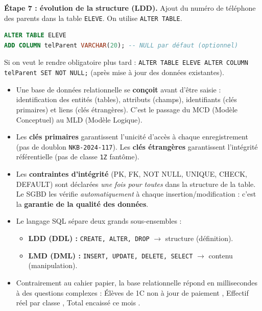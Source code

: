 \documentclass[11pt]{article}
\newcounter{popsec}
\newcounter{popsub}
\newcommand{\courssub}[1]{%
  \stepcounter{popsub}%
  \par\vspace{9pt}\noindent{\popxbold\fontsize{11.5}{13}\selectfont\color{popink}{\color{poporange}\thepopsec.\thepopsub}\hspace{6pt}#1}\par\nopagebreak\vspace{4pt}
}
\begin{document}
\begin{exoresolu}
\textbf{Étape 7 : évolution de la structure (LDD).}
Ajout du numéro de téléphone des parents dans la table \texttt{ELEVE}. On utilise \texttt{ALTER TABLE}.
\begin{lstlisting}[language=SQL]
ALTER TABLE ELEVE
ADD COLUMN telParent VARCHAR(20); -- NULL par défaut (optionnel)
\end{lstlisting}
Si on veut le rendre obligatoire plus tard : \texttt{ALTER TABLE ELEVE ALTER COLUMN telParent SET NOT NULL;} (après mise à jour des données existantes).
\end{exoresolu}

\courssub{Bilan de l'activité}

\begin{aretenir}
\begin{itemize}
\item Une base de données relationnelle se \textbf{conçoit} avant d'être saisie : identification des entités (tables), attributs (champs), identifiants (clés primaires) et liens (clés étrangères). C'est le passage du MCD (Modèle Conceptuel) au MLD (Modèle Logique).
\item Les \textbf{clés primaires} garantissent l'unicité d'accès à chaque enregistrement (pas de doublon \texttt{NKB-2024-117}). Les \textbf{clés étrangères} garantissent l'intégrité référentielle (pas de classe \texttt{1Z} fantôme).
\item Les \textbf{contraintes d'intégrité} (PK, FK, NOT NULL, UNIQUE, CHECK, DEFAULT) sont déclarées \emph{une fois pour toutes} dans la structure de la table. Le SGBD les vérifie \emph{automatiquement} à chaque insertion/modification : c'est la \textbf{garantie de la qualité des données}.
\item Le langage SQL sépare deux grands sous-ensembles :
\begin{itemize}
\item \textbf{LDD (DDL) :} \texttt{CREATE, ALTER, DROP} $\rightarrow$ structure (définition).
\item \textbf{LMD (DML) :} \texttt{INSERT, UPDATE, DELETE, SELECT} $\rightarrow$ contenu (manipulation).
\end{itemize}
\item Contrairement au cahier papier, la base relationnelle répond en millisecondes à des questions complexes : \og Élèves de 1C non à jour de paiement \fg, \og Effectif réel par classe \fg, \og Total encaissé ce mois \fg.
\end{itemize}
\end{aretenir}
\end{document}
